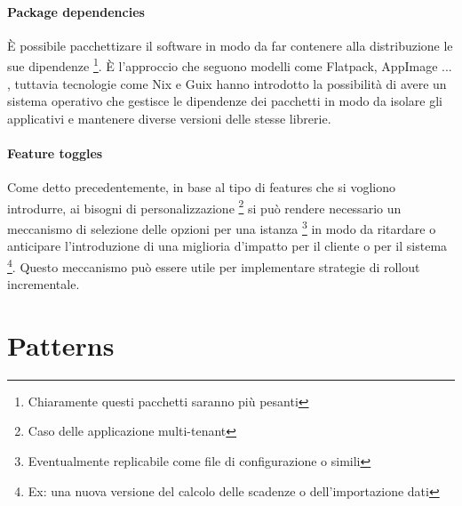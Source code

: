 \documentclass[a4paper,11pt,oneside, table]{article}
\begin{document}
  \paragraph{Package dependencies}

  \`E possibile pacchettizare il software in modo da far contenere alla distribuzione le sue dipendenze \footnote{Chiaramente questi pacchetti saranno pi\`u pesanti}. \`E l'approccio che seguono modelli come Flatpack, AppImage ... \cite{cichocki2023comparative}, tuttavia tecnologie come Nix \cite{dolstra2004nix} e Guix \cite{courtes2013functional} hanno introdotto la possibilit\`a di avere un sistema operativo che gestisce le dipendenze dei pacchetti in modo da isolare gli applicativi e mantenere diverse versioni delle stesse librerie.

  \paragraph{Feature toggles}

  Come detto precedentemente, in base al tipo di features che si vogliono introdurre, ai bisogni di personalizzazione \footnote{Caso delle applicazione multi-tenant} si pu\`o rendere necessario un meccanismo di selezione delle opzioni per una istanza \footnote{Eventualmente replicabile come file di configurazione o simili} in modo da ritardare o anticipare l'introduzione di una miglioria d'impatto per il cliente o per il sistema \footnote{Ex: una nuova versione del calcolo delle scadenze o dell'importazione dati}. Questo meccanismo pu\`o essere utile per implementare strategie di rollout incrementale.

  \section{Patterns}

  \printbibliography[title={Bibliografia}]
  \printindex
\end{document}
